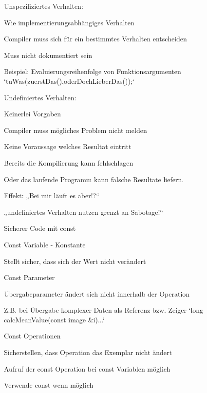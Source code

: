 \documentclass[a4paper]{article}
\begin{document}
\begin{multicols}{3}
  \begin{itemize*}
    \item Unspezifiziertes Verhalten:
    \item Wie implementierungsabhängiges Verhalten
    \item Compiler muss sich für ein bestimmtes Verhalten entscheiden
    \item Muss nicht dokumentiert sein
    \item Beispiel: Evaluierungsreihenfolge von Funktionsargumenten `tuWas(zuerstDas(),oderDochLieberDas());`
    \item Undefiniertes Verhalten:
    \item Keinerlei Vorgaben
    \item Compiler muss mögliches Problem nicht melden
    \item Keine Voraussage welches Resultat eintritt
    \item Bereits die Kompilierung kann fehlschlagen
    \item Oder das laufende Programm kann falsche Resultate liefern.
    \item Effekt: „Bei mir läuft es aber!?“
    \item „undefiniertes Verhalten nutzen grenzt an Sabotage!“
  \end{itemize*}

  Sicherer Code mit const
  \begin{itemize*}
    \item Const Variable - Konstante
          \begin{itemize*}
            \item Stellt sicher, dass sich der Wert nicht verändert
          \end{itemize*}
    \item Const Parameter
          \begin{itemize*}
            \item Übergabeparameter ändert sich nicht innerhalb der Operation
            \item Z.B. bei Übergabe komplexer Daten als Referenz bzw. Zeiger `long calcMeanValue(const image \&i){...}`
          \end{itemize*}
    \item Const Operationen
          \begin{itemize*}
            \item Sicherstellen, dass Operation das Exemplar nicht ändert
            \item Aufruf der const Operation bei const Variablen möglich
          \end{itemize*}
    \item Verwende const wenn möglich
  \end{itemize*}



\end{multicols}
\end{document}
